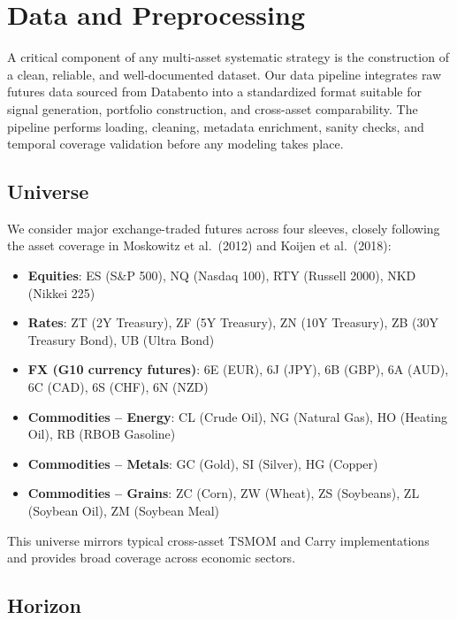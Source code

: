 \documentclass{article}
\begin{document}
\section{Data and Preprocessing}

A critical component of any multi-asset systematic strategy is the construction of a clean, reliable,
and well-documented dataset. Our data pipeline integrates raw futures data sourced from Databento
into a standardized format suitable for signal generation, portfolio construction, and cross-asset
comparability. The pipeline performs loading, cleaning, metadata enrichment, sanity checks, and temporal
coverage validation before any modeling takes place.

\subsection{Universe}

We consider major exchange-traded futures across four sleeves, closely following the asset coverage in
Moskowitz et al.\ (2012) and Koijen et al.\ (2018):

\begin{itemize}
    \item \textbf{Equities}: ES (S\&P 500), NQ (Nasdaq 100), RTY (Russell 2000), NKD (Nikkei 225)
    
    \item \textbf{Rates}: ZT (2Y Treasury), ZF (5Y Treasury), ZN (10Y Treasury), 
          ZB (30Y Treasury Bond), UB (Ultra Bond)

    \item \textbf{FX (G10 currency futures)}: 6E (EUR), 6J (JPY), 6B (GBP), 
          6A (AUD), 6C (CAD), 6S (CHF), 6N (NZD)

    \item \textbf{Commodities – Energy}: CL (Crude Oil), NG (Natural Gas), HO (Heating Oil), RB (RBOB Gasoline)

    \item \textbf{Commodities – Metals}: GC (Gold), SI (Silver), HG (Copper)

    \item \textbf{Commodities – Grains}: ZC (Corn), ZW (Wheat), ZS (Soybeans), 
          ZL (Soybean Oil), ZM (Soybean Meal)
\end{itemize}

This universe mirrors typical cross-asset TSMOM and Carry implementations and provides broad coverage
across economic sectors.

\subsection{Horizon}
\end{document}

